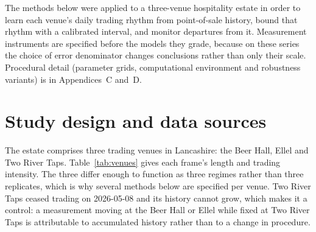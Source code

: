 %
%
\label{chap:methodology}

The methods below were applied to a three-venue hospitality estate in order to learn each
venue's daily trading rhythm from point-of-sale history, bound that rhythm with a calibrated
interval, and monitor departures from it. Measurement instruments are specified before the
models they grade, because on these series the choice of error denominator changes conclusions
rather than only their scale. Procedural detail (parameter grids, computational environment
and robustness variants) is in Appendices~C and~D.

\section{Study design and data sources}
\label{sec:design}

The estate comprises three trading venues in Lancashire: the Beer Hall, Ellel and Two River
Taps. Table~\ref{tab:venues} gives each frame's length and trading intensity. The three differ
enough to function as three regimes rather than three replicates, which is why several methods
below are specified per venue. Two River Taps ceased trading on 2026-05-08 and its history
cannot grow, which makes it a control: a measurement moving at the Beer Hall or Ellel while
fixed at Two River Taps is attributable to accumulated history rather than to a change in
procedure.

